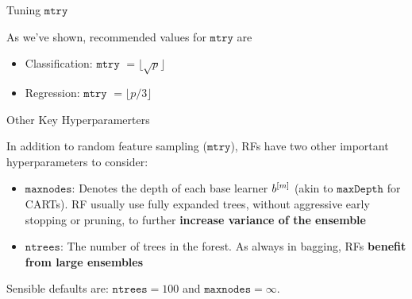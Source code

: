\documentclass[11pt,compress,t,notes=noshow, xcolor=table]{beamer}
\begin{document}
\begin{vbframe}{Tuning $\texttt{mtry}$}

As we've shown, recommended values for $\texttt{mtry}$ are

\begin{itemize}
  \item Classification: $\texttt{mtry}$ $ = \lfloor \sqrt{p} \rfloor$
  \item Regression: $\texttt{mtry}$ $ = \lfloor p/3 \rfloor$
\end{itemize}

\end{vbframe}

\begin{vbframe}{Other Key Hyperparamerters}

In addition to random feature sampling ($\texttt{mtry}$), RFs have two other important hyperparameters to consider:

\begin{itemize}
  \item $\texttt{maxnodes}$: Denotes the depth of each base learner $b^{[m]}$ (akin to $\texttt{maxDepth}$ for CARTs). RF usually use fully expanded trees, without aggressive early stopping or pruning, to further \textbf{increase variance of the ensemble} 
  \item $\texttt{ntrees}$: The number of trees in the forest. As always in bagging, RFs \textbf{benefit from large ensembles} 
\end{itemize}

Sensible defaults are: $\texttt{ntrees} = 100$ and $\texttt{maxnodes} = \infty$.

\end{vbframe}
\end{document}
